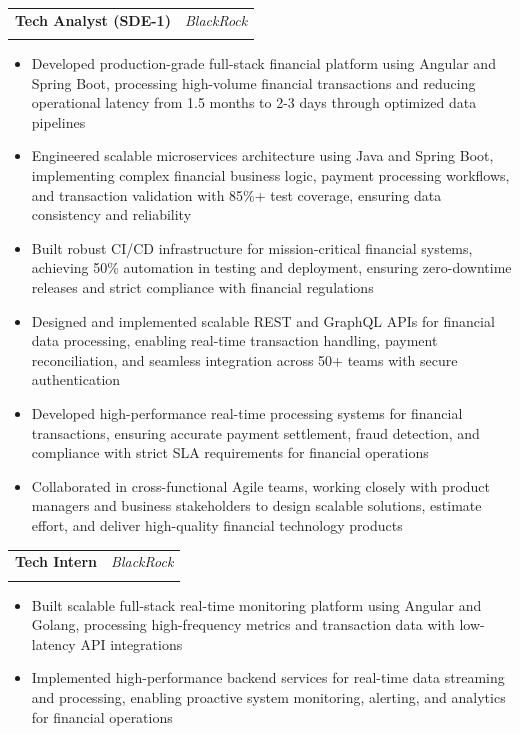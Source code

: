 \documentclass[11pt,a4paper]{article}
\makeatletter
\newcommand{\resumeItem}[1]{\item\small{#1}}
\newlength{\resumeLeftCol}
\newlength{\resumeRightCol}
\newcommand{\resumeHeading}[4]{
  \begin{tabular*}{\textwidth}{@{}p{\resumeLeftCol}@{\extracolsep{\fill}}>{\raggedleft\arraybackslash}p{\resumeRightCol}@{}}
    \textbf{#1} & \textit{#2} \\
    & \textit{\ifstrempty{#4}{#3}{#3 \ #4}}
  \end{tabular*}
  \vspace{-4pt}
}
\makeatother
\begin{document}
\resumeHeading{Tech Analyst (SDE-1)}{BlackRock}{July 2021 - June 2023}{}
\begin{itemize}[leftmargin=*,noitemsep,topsep=0pt]
    \resumeItem{Developed production-grade full-stack financial platform using Angular and Spring Boot, processing high-volume financial transactions and reducing operational latency from 1.5 months to 2-3 days through optimized data pipelines}
    \resumeItem{Engineered scalable microservices architecture using Java and Spring Boot, implementing complex financial business logic, payment processing workflows, and transaction validation with 85\%+ test coverage, ensuring data consistency and reliability}
    \resumeItem{Built robust CI/CD infrastructure for mission-critical financial systems, achieving 50\% automation in testing and deployment, ensuring zero-downtime releases and strict compliance with financial regulations}
    \resumeItem{Designed and implemented scalable REST and GraphQL APIs for financial data processing, enabling real-time transaction handling, payment reconciliation, and seamless integration across 50+ teams with secure authentication}
    \resumeItem{Developed high-performance real-time processing systems for financial transactions, ensuring accurate payment settlement, fraud detection, and compliance with strict SLA requirements for financial operations}
    \resumeItem{Collaborated in cross-functional Agile teams, working closely with product managers and business stakeholders to design scalable solutions, estimate effort, and deliver high-quality financial technology products}
\end{itemize}

\resumeHeading{Tech Intern}{BlackRock}{January 2021 - July 2021}{}
\begin{itemize}[leftmargin=*,noitemsep,topsep=0pt]
    \resumeItem{Built scalable full-stack real-time monitoring platform using Angular and Golang, processing high-frequency metrics and transaction data with low-latency API integrations}
    \resumeItem{Implemented high-performance backend services for real-time data streaming and processing, enabling proactive system monitoring, alerting, and analytics for financial operations}
\end{itemize}
\end{document}
